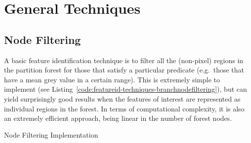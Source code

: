 \section{General Techniques}


\subsection{Node Filtering}

A basic feature identification technique is to filter all the (non-pixel) regions in the partition forest for those that satisfy a particular predicate (e.g.~those that have a mean grey value in a certain range). This is extremely simple to implement (see Listing~\ref{code:featureid-techniques-branchnodefiltering}), but can yield surprisingly good results when the features of interest are represented as individual regions in the forest. In terms of computational complexity, it is also an extremely efficient approach, being linear in the number of forest nodes.

\begin{stulisting}[p]
\caption{Node Filtering Implementation}
\label{code:featureid-techniques-branchnodefiltering}

\end{stulisting}

